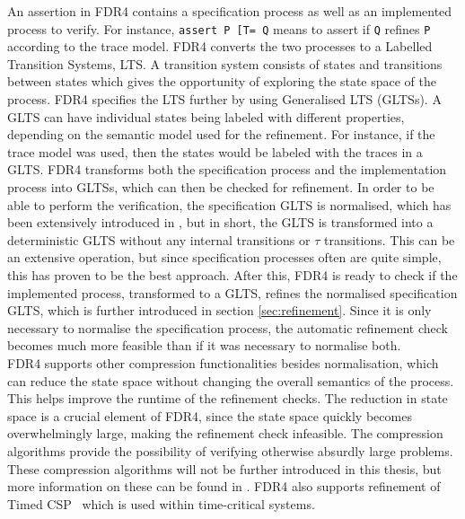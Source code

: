 An assertion in FDR4 contains a specification process as well as an implemented process to verify. For instance, \texttt{assert P [T= Q} means to assert if \texttt{Q} refines \texttt{P} according to the trace model.
FDR4 converts the two processes to a Labelled Transition Systems, LTS. A transition system consists of states and transitions between states which gives the opportunity of exploring the state space of the process.
FDR4 specifies the LTS further by using Generalised LTS (GLTSs). A GLTS can have individual states being labeled with different properties, depending on the semantic model used for the refinement. For instance, if the trace model was used, then the states would be labeled with the traces in a GLTS.
FDR4 transforms both the specification process and the implementation process into GLTSs, which can then be checked for refinement. In order to be able to perform the verification, the specification GLTS is normalised, which has been extensively introduced in \cite{Roscoe1997}, but in short, the GLTS is transformed into a deterministic GLTS without any internal transitions or $\tau$ transitions. This can be an extensive operation, but since specification processes often are quite simple, this has proven to be the best approach.
After this, FDR4 is ready to check if the implemented process, transformed to a GLTS, refines the normalised specification GLTS, which is further introduced in section \ref{sec:refinement}. Since it is only necessary to normalise the specification process, the automatic refinement check becomes much more feasible than if it was necessary to normalise both. \\

FDR4 supports other compression functionalities besides normalisation, which can reduce the state space without changing the overall semantics of the process. This helps improve the runtime of the refinement checks. The reduction in state space is a crucial element of FDR4, since the state space quickly becomes overwhelmingly large, making the refinement check infeasible. The compression algorithms provide the possibility of verifying otherwise absurdly large problems.
These compression algorithms will not be further introduced in this thesis, but more information on these can be found in \cite{Roscoe2010}.
FDR4 also supports refinement of Timed CSP~\cite{REED1988249, armstrong2014model} which is used within time-critical systems.
